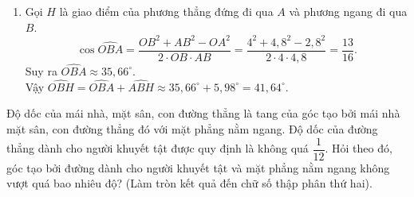 \begin{vd}
{\begin{enumerate}
			\item Gọi $H$ là giao điểm của phương thẳng đứng đi qua $A$ và phương ngang đi qua $B$.
			\[\cos\widehat{OBA}=\dfrac{OB^2+AB^2-OA^2}{2\cdot OB\cdot AB}=\dfrac{4^2+4{,}8^2-2{,}8^2}{2\cdot 4\cdot 4{,}8}=\dfrac{13}{16}.\]
			Suy ra $\widehat{OBA}\approx 35{,}66^\circ$.\\
			Vậy $\widehat{OBH}=\widehat{OBA}+\widehat{ABH}\approx 35{,}66^\circ+5{,}98^\circ=41{,}64^\circ$.
		\end{enumerate}
	} 
\end{vd}

\begin{vd}%
	Độ dốc của mái nhà, mặt sân, con đường thẳng là tang của góc tạo bởi mái nhà mặt sân, con đường thẳng đó với mặt phẳng nằm ngang. Độ dốc của đường thẳng dành cho người khuyết tật được quy định là không quá $\dfrac{1}{12}$. Hỏi theo đó, góc tạo bởi đường dành cho người khuyết tật và mặt phẳng nằm ngang không vượt quá bao nhiêu độ? (Làm tròn kết quả đến chữ số thập phân thứ hai).
\end{vd}

